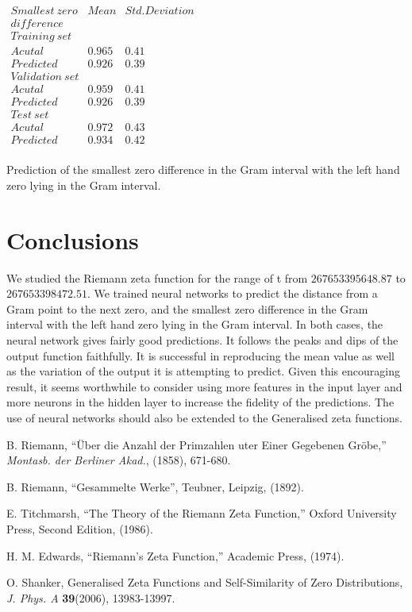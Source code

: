 \documentclass[twoside]{article}
\begin{document}
\begin{table}
\centering \(\begin{array}{c|c|c}
Smallest~zero  & Mean & Std. Deviation \\
difference  &  &  \\
\hline
Training~set \\
\hline
Acutal       & 0.965 &  0.41 \\
Predicted     & 0.926 & 0.39 \\
\hline
Validation~set \\
\hline
Acutal       & 0.959 & 0.41 \\
Predicted     & 0.926 & 0.39 \\
\hline
Test~set \\
\hline
Acutal       & 0.972 & 0.43 \\
Predicted     & 0.934 & 0.42 \\

\end{array}\)
\caption{Prediction of the smallest zero difference in the Gram interval
with the left hand zero lying in the Gram interval.} \label{tab:zeroDiff}
\end{table}



\section{\label{conclusions}Conclusions}

We studied the Riemann zeta function for the range of t from $267653395648.87$ to $267653398472.51$.
We trained neural networks to predict the distance from a 
Gram point to the next zero, and the smallest zero difference in the Gram interval
with the left hand zero lying in the Gram interval.
In both cases, the neural network gives fairly good predictions. 
It follows the peaks and dips of the output function faithfully. It is
successful in reproducing the mean value as well as the variation of the
output it is attempting to predict. Given this encouraging result,
it seems worthwhile to consider using more features in the input layer
and more neurons in the hidden layer to increase the fidelity of the predictions.
The use of neural networks should also be extended to the Generalised zeta functions.
 
\begin{thebibliography}{10} 

 B. Riemann, ``\"{U}ber die Anzahl der Primzahlen uter
Einer Gegebenen Gr\"{o}be,'' {\it Montasb. der Berliner Akad.}, (1858),
671-680.

 B. Riemann, ``Gesammelte Werke'', Teubner, Leipzig, (1892).

 E. Titchmarsh, ``The Theory of the Riemann Zeta
Function,'' Oxford University Press, Second Edition, (1986).

 H. M. Edwards, ``Riemann's Zeta Function,'' 
Academic Press,  (1974).

 O. Shanker, 
Generalised Zeta Functions and Self-Similarity of Zero Distributions,
{\it J.  Phys. A} {\bf39}(2006), 13983-13997.


\end{thebibliography} 
\end{document}
